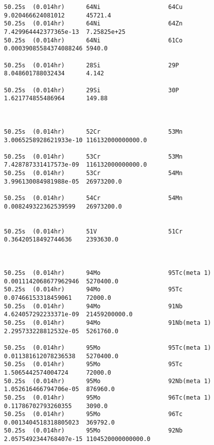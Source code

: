 \begin{lstlisting}[style=sOutputFile,caption={Final results for steel irradiation},label={listing:alexsteel}]
50.25s  (0.014hr)      64Ni                   64Cu                   9.020466624081012      45721.4               
50.25s  (0.014hr)      64Ni                   64Zn                   7.429964442377365e-13  7.25825e+25           
50.25s  (0.014hr)      64Ni                   61Co                   0.00039085584374088246 5940.0                

50.25s  (0.014hr)      28Si                   29P                    8.048601788032434      4.142                 

50.25s  (0.014hr)      29Si                   30P                    1.621774855486964      149.88                



50.25s  (0.014hr)      52Cr                   53Mn                   3.0065258928621933e-10 116132000000000.0     

50.25s  (0.014hr)      53Cr                   53Mn                   7.428787331417573e-09  116132000000000.0     
50.25s  (0.014hr)      53Cr                   54Mn                   3.996130084981988e-05  26973200.0            

50.25s  (0.014hr)      54Cr                   54Mn                   0.008249322362539599   26973200.0            


50.25s  (0.014hr)      51V                    51Cr                   0.36420518492744636    2393630.0             



50.25s  (0.014hr)      94Mo                   95Tc(meta 1)           0.0011142068677962946  5270400.0             
50.25s  (0.014hr)      94Mo                   95Tc                   0.07466153318459061    72000.0               
50.25s  (0.014hr)      94Mo                   91Nb                   4.624057292233371e-09  21459200000.0         
50.25s  (0.014hr)      94Mo                   91Nb(meta 1)           2.295733228812532e-05  5261760.0             

50.25s  (0.014hr)      95Mo                   95Tc(meta 1)           0.011381612078236538   5270400.0             
50.25s  (0.014hr)      95Mo                   95Tc                   1.5065442574004724     72000.0               
50.25s  (0.014hr)      95Mo                   92Nb(meta 1)           1.052616466794706e-05  876960.0              
50.25s  (0.014hr)      95Mo                   96Tc(meta 1)           0.11786702793260355    3090.0                
50.25s  (0.014hr)      95Mo                   96Tc                   0.0013404518318805023  369792.0              
50.25s  (0.014hr)      95Mo                   92Nb                   2.0575492344768407e-15 1104520000000000.0    


\end{lstlisting}
